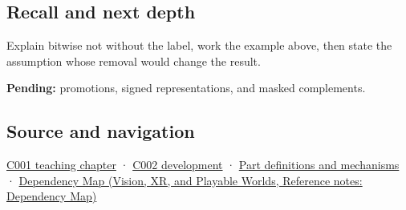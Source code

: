 \subsection{Recall and next depth}\label{appendix-8f38927cfc54-recall-and-next-depth}

Explain bitwise not without the label, work the example above, then state the assumption whose removal would change the result.

\textbf{Pending:} promotions, signed representations, and masked complements.

\subsection{Source and navigation}\label{appendix-8f38927cfc54-source-and-navigation}

\hyperref[01-foundations-i-ch001-from-a-signal-to-an-interpretation]{C001 teaching chapter} · \hyperref[01-foundations-i-ch001-arithmetic-becomes-a-policy]{C002 development} · \hyperref[appendix-fd090d982a15]{Part definitions and mechanisms} · \href{../07-Vision-XR-and-Playable-Worlds/main.pdf\#nameddest=appendix-4ad47bdd269a}{Dependency Map (Vision, XR, and Playable Worlds, Reference notes: Dependency Map)}
